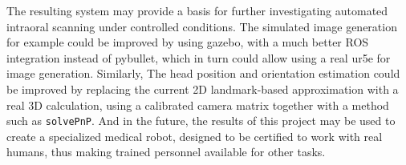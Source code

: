 \newline\newline
The resulting system may provide a basis for further investigating automated intraoral scanning under controlled conditions. The simulated image generation for example could be improved by using gazebo, with a much better ROS integration instead of pybullet, which in turn could allow using a real ur5e for image generation. Similarly, The head position and orientation estimation could be improved by replacing the current 2D landmark-based approximation with a real 3D calculation, using a calibrated camera matrix together with a method such as \texttt{solvePnP}. And in the future, the results of this project may be used to create a specialized medical robot, designed to be certified to work with real humans, thus making trained personnel available for other tasks.

